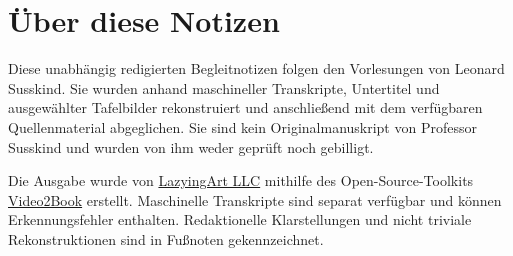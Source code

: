 \documentclass[11pt,oneside]{book}
\begin{document}
\frontmatter
\hypersetup{pageanchor=false}

\hypersetup{pageanchor=true}

\clearpage
\chapter*{Über diese Notizen}
Diese unabhängig redigierten Begleitnotizen folgen den Vorlesungen von Leonard Susskind. Sie wurden anhand maschineller Transkripte, Untertitel und ausgewählter Tafelbilder rekonstruiert und anschließend mit dem verfügbaren Quellenmaterial abgeglichen. Sie sind kein Originalmanuskript von Professor Susskind und wurden von ihm weder geprüft noch gebilligt.

Die Ausgabe wurde von \href{https://lazying.art}{LazyingArt LLC} mithilfe des Open-Source-Toolkits \href{https://github.com/lachlanchen/Video2Book}{Video2Book} erstellt. Maschinelle Transkripte sind separat verfügbar und können Erkennungsfehler enthalten. Redaktionelle Klarstellungen und nicht triviale Rekonstruktionen sind in Fußnoten gekennzeichnet.
\clearpage
\tableofcontents
\mainmatter









\end{document}
